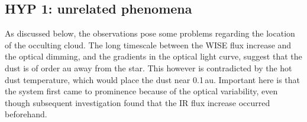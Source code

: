 \documentclass{aa}
\begin{document}
%

%
%
%
%
%




\subsection{HYP 1: unrelated phenomena} 

As discussed below, the observations pose some problems regarding the location of the occulting cloud.
%
The long timescale between the WISE flux increase and the optical dimming, and the gradients in the optical light curve, suggest that the dust is of order au away from the star.
%
This however is contradicted by the hot dust temperature, which would place the dust near 0.1\,au.
%
Important here is that the system first came to prominence because of the optical variability, even though subsequent investigation found that the IR flux increase occurred beforehand.
\end{document}
